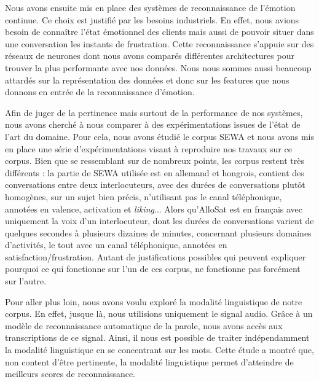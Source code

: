 Nous avons ensuite mis en place des systèmes de reconnaissance de l'émotion continue. Ce choix est justifié par les besoins industriels. En effet, nous avions besoin de connaître l'état émotionnel des clients mais aussi de pouvoir situer dans une conversation les instants de frustration. Cette reconnaissance s'appuie sur des réseaux de neurones dont nous avons comparés différentes architectures pour trouver la plus performante avec nos données. Nous nous sommes aussi beaucoup attardés sur la représentation des données et donc sur les features que nous donnons en entrée de la reconnaissance d'émotion.

Afin de juger de la pertinence mais surtout de la performance de nos systèmes, nous avons cherché à nous comparer à des expérimentations issues de l'état de l'art du domaine. Pour cela, nous avons étudié le corpus SEWA et nous avons mis en place une série d'expérimentations visant à reproduire nos travaux sur ce corpus. Bien que se ressemblant sur de nombreux points, les corpus restent très différents : la partie de SEWA utilisée est en allemand et hongrois, contient des conversations entre deux interlocuteurs, avec des durées de conversations plutôt homogènes, sur un sujet bien précis, n'utilisant pas le canal téléphonique, annotées en valence, activation et \textit{liking}... Alors qu'AlloSat est en français avec uniquement la voix d'un interlocuteur, dont les durées de conversations varient de quelques secondes à plusieurs dizaines de minutes, concernant plusieurs domaines d'activités, le tout avec un canal téléphonique, annotées en satisfaction/frustration. Autant de justifications possibles qui peuvent expliquer pourquoi ce qui fonctionne sur l'un de ces corpus, ne fonctionne pas forcément sur l'autre.

Pour aller plus loin, nous avons voulu exploré la modalité linguistique de notre corpus. En effet, jusque là, nous utilisions uniquement le signal audio. Grâce à un modèle de reconnaissance automatique de la parole, nous avons accès aux transcriptions de ce signal. Ainsi, il nous est possible de traiter indépendamment la modalité linguistique en se concentrant sur les mots. Cette étude a montré que, non content d'être pertinente, la modalité linguistique permet d'atteindre de meilleurs scores de reconnaissance. %

